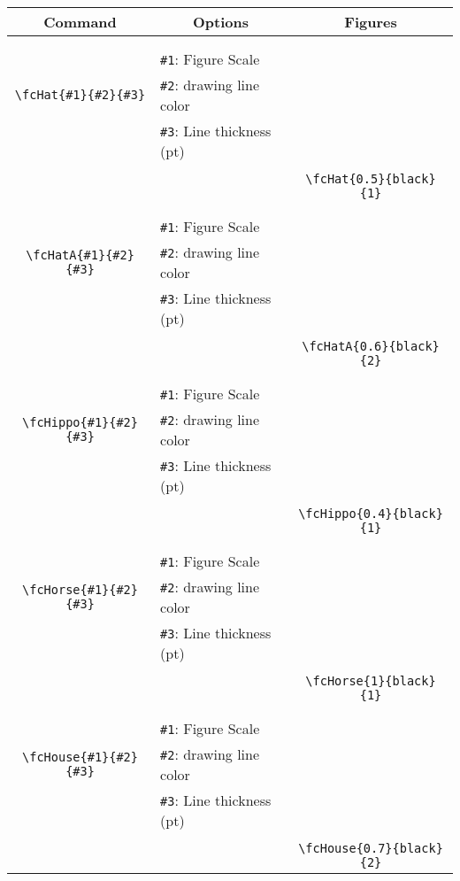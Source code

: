 \documentclass{article}
\begin{document}
\begin{table}[H]\centering\begin{tabular}{|c|l|c|}\hline {\bf Command}& \multicolumn{1}{c|}{{\bf Options}} & {\bf Figures}\\  \hline	&&\multirow{5}{*}{\fcHat{0.5}{black}{1}}\\	&&\\	&\verb|#1|: Figure Scale &\\	\verb|\fcHat{#1}{#2}{#3}|&	\verb|#2|: drawing line color &\\	&\verb|#3|: Line thickness (pt) &\\ &&\\&&	\verb|\fcHat{0.5}{black}{1}|\\\hline 	
	&&\multirow{5}{*}{\fcHatA{0.6}{black}{2}}\\	&&\\	&\verb|#1|: Figure Scale &\\	\verb|\fcHatA{#1}{#2}{#3}|&	\verb|#2|: drawing line color &\\	&\verb|#3|: Line thickness (pt) &\\ &&\\&&	\verb|\fcHatA{0.6}{black}{2}|\\\hline 	
	&&\multirow{5}{*}{\fcHippo{0.4}{black}{1}}\\	&&\\	&\verb|#1|: Figure Scale &\\	\verb|\fcHippo{#1}{#2}{#3}|&	\verb|#2|: drawing line color &\\	&\verb|#3|: Line thickness (pt) &\\ &&\\&&	\verb|\fcHippo{0.4}{black}{1}|\\\hline 	
	&&\multirow{5}{*}{\fcHorse{1}{black}{1}}\\	&&\\	&\verb|#1|: Figure Scale &\\	\verb|\fcHorse{#1}{#2}{#3}|&	\verb|#2|: drawing line color &\\	&\verb|#3|: Line thickness (pt) &\\ &&\\&&	\verb|\fcHorse{1}{black}{1}|\\\hline 	
	&&\multirow{5}{*}{\fcHouse{0.7}{black}{2}}\\	&&\\	&\verb|#1|: Figure Scale &\\	\verb|\fcHouse{#1}{#2}{#3}|&	\verb|#2|: drawing line color &\\	&\verb|#3|: Line thickness (pt) &\\ &&\\&&	\verb|\fcHouse{0.7}{black}{2}|\\\hline 	

\end{tabular}
\end{table}
\end{document}
